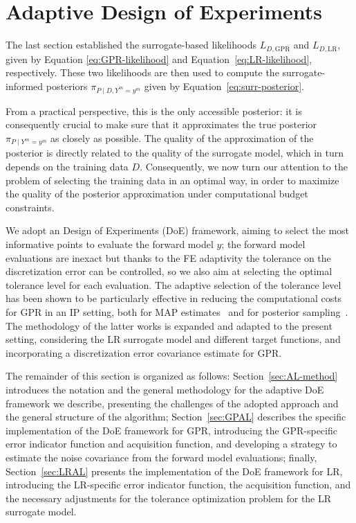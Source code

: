 \section{Adaptive Design of Experiments}\label{sec:AL}
The last section established the surrogate-based likelihoods $L_{D, \text{GPR}}$ and $L_{D, \text{LR}}$, given by Equation \eqref{eq:GPR-likelihood} and Equation~\eqref{eq:LR-likelihood}, respectively.
These two likelihoods are then used to compute the surrogate-informed posteriors $\pi_{P\mid D, Y^m = y^m} $ given by Equation~\eqref{eq:surr-posterior}.

From a practical perspective, this is the only accessible posterior: it is consequently crucial to make sure that it approximates the true posterior $\pi_{P\mid Y^m = y^m}$ as closely as possible.
The quality of the approximation of the posterior is directly related to the quality of the surrogate model, which in turn depends on the training data $D$.
Consequently, we now turn our attention to the problem of selecting the training data in an optimal way, in order to maximize the quality of the posterior approximation under computational budget constraints.

We adopt an Design of Experiments (DoE) framework, aiming to select the most informative points to evaluate the forward model $y$; the forward model evaluations are inexact but thanks to the FE adaptivity the tolerance on the discretization error can be controlled, so we also aim at selecting the optimal tolerance level for each evaluation.
The adaptive selection of the tolerance level has been shown to be particularly effective in reducing the computational costs for GPR in an IP setting, both for MAP estimates~\cite{SemlerWeiser2023,SemlerWeiser2024} and for posterior sampling~\cite{VillaniUngerWeiser2024}.
The methodology of the latter works is expanded and adapted to the present setting, considering the LR surrogate model and different target functions, and incorporating a discretization error covariance estimate for GPR. \medbreak

The remainder of this section is organized as follows: Section~\ref{sec:AL-method} introduces the notation and the general methodology for the adaptive DoE framework we describe, presenting the challenges of the adopted approach and the general structure of the algorithm; Section~\ref{sec:GPAL} describes the specific implementation of the DoE framework for GPR, introducing the GPR-specific error indicator function and acquisition function, and developing a strategy to estimate the noise covariance from the forward model evaluations; finally, Section~\ref{sec:LRAL} presents the implementation of the DoE framework for LR, introducing the LR-specific error indicator function, the acquisition function, and the necessary adjustments for the tolerance optimization problem for the LR surrogate model.

